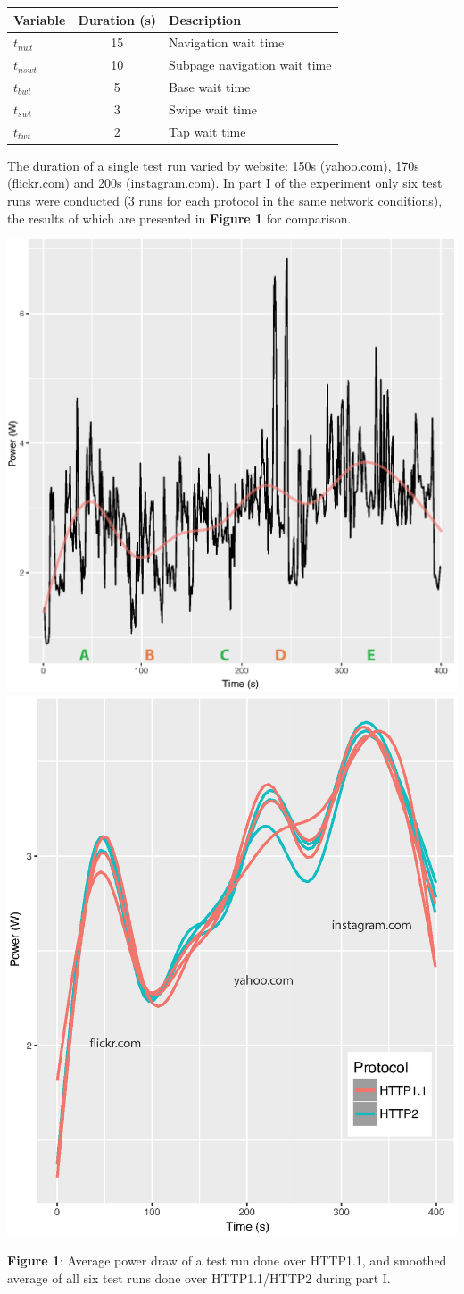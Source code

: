\documentclass[noback]{cuposter}
\begin{document}
\begin{center}
    \begin{tabular}{l|c|l}
        \textbf{Variable} & \textbf{Duration (s)} & \textbf{Description} \\
        \hline
        $t_{nwt}$   & 15    & Navigation wait time \\
        $t_{nswt}$  & 10    & Subpage navigation wait time \\
        $t_{bwt}$   & 5     & Base wait time \\
        $t_{swt}$   & 3     & Swipe wait time \\
        $t_{twt}$   & 2     & Tap wait time
    \end{tabular}
\end{center}
\vspace{2mm}
The duration of a single test run varied by website: 150s (yahoo.com), 170s (flickr.com) and 200s (instagram.com). In part I of the experiment only six test runs were conducted (3 runs for each protocol in the same network conditions), the results of which are presented in \textbf{Figure 1} for comparison.\\

\centerline{
    \includegraphics[width=0.5\linewidth]{../../images/part_1_average_power}
    \includegraphics[width=0.5\linewidth]{../../images/part_1_smoothed_power}
}
\begin{center}
    \textbf{Figure 1}: Average power draw of a test run done over HTTP1.1, and smoothed average of all six test runs done over HTTP1.1/HTTP2 during part I.
\end{center}
\vspace{-10mm}
\end{document}
